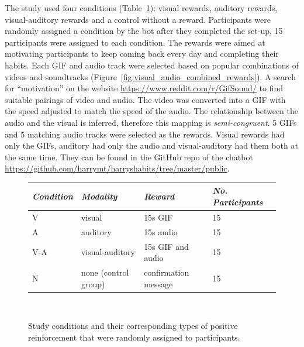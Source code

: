 The study used four conditions (Table~\ref{table:precise_rewards}): visual rewards, auditory rewards, visual-auditory rewards and a control without a reward. Participants were randomly assigned a condition by the bot after they completed the set-up, 15 participants were assigned to each condition. The rewards were aimed at motivating participants to keep coming back every day and completing their habits. Each GIF and audio track were selected based on popular combinations of videos and soundtracks (Figure~\ref{fig:visual_audio_combined_rewards}). A search for ``motivation'' on the website \url{https://www.reddit.com/r/GifSound/} to find suitable pairings of video and audio. The video was converted into a GIF with the speed adjusted to match the speed of the audio. The relationship between the audio and the visual is inferred, therefore this mapping is \textit{semi-congruent}. 5 GIFs and 5 matching audio tracks were selected as the rewards. Visual rewards had only the GIFs, auditory had only the audio and visual-auditory had them both at the same time. They can be found in the GitHub repo of the chatbot \url{https://github.com/harrymt/harryshabits/tree/master/public}.

\begin{figure}[H]
  \centering
  \begin{tabular}{l l l l}
    {\small \textit{Condition}} & {\small\textit{Modality}} & {\small \textit{Reward}} & {\small \textit{No. Participants}}  \\ \hline
    V & visual & 15s GIF & 15 \\
    A & auditory & 15s audio & 15 \\
    V-A & visual-auditory & 15s GIF and audio & 15 \\
    N & none (control group) & confirmation message & 15 \\
  \end{tabular}
  \caption{Study conditions and their corresponding types of positive reinforcement that were randomly assigned to participants.}~\label{table:precise_rewards}
\end{figure}

